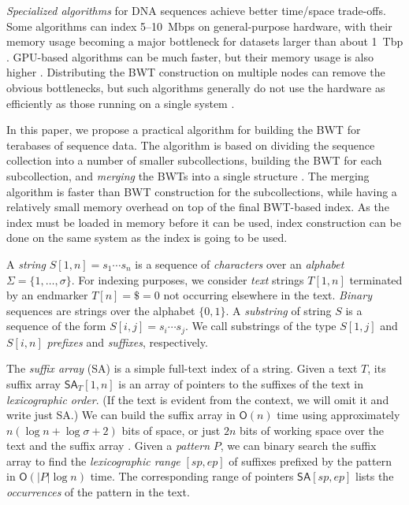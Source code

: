 \documentclass[smallabstract,smallcaptions]{dccpaper}
\newcommand{\set}[1]{\ensuremath{\{ #1 \}}}
\newcommand{\abs}[1]{\ensuremath{\lvert #1 \rvert}}
\newcommand{\Oh}{\ensuremath{\mathsf{O}}}
\newcommand{\SA}{\textsf{SA}}
\newcommand{\BWT}{\textsf{BWT}}
\newcommand{\mSA}{\ensuremath{\mathsf{SA}}}
\begin{document}
\emph{Specialized algorithms} for DNA sequences achieve better time/space trade-offs. Some algorithms can index 5\nobreakdash--10~Mbps on general-purpose hardware, with their memory usage becoming a major bottleneck for datasets larger than about 1~Tbp \cite{Bauer2013,Li2014a}. GPU-based algorithms can be much faster, but their memory usage is also higher \cite{Liu2014,Pantaleoni2014}. Distributing the \BWT{} construction on multiple nodes can remove the obvious bottlenecks, but such algorithms generally do not use the hardware as efficiently as those running on  a single system \cite{Wang2015}.

In this paper, we propose a practical algorithm for building the \BWT{} for terabases of sequence data. The algorithm is based on dividing the sequence collection into a number of smaller subcollections, building the \BWT{} for each subcollection, and \emph{merging} the \BWT{}s into a single structure \cite{Siren2009}. The merging algorithm is faster than \BWT{} construction for the subcollections, while having a relatively small memory overhead on top of the final \BWT-based index. As the index must be loaded in memory before it can be used, index construction can be done on the same system as the index is going to be used.



A \emph{string} $S[1,n] = s_{1} \dotsm s_{n}$ is a sequence of \emph{characters} over an \emph{alphabet} $\Sigma = \set{1, \dotsc, \sigma}$. For indexing purposes, we consider \emph{text} strings $T[1,n]$ terminated by an endmarker $T[n] = \$ = 0$ not occurring elsewhere in the text. \emph{Binary} sequences are strings over the alphabet $\set{0, 1}$. A \emph{substring} of string $S$ is a sequence of the form $S[i,j] = s_{i} \dotsm s_{j}$. We call substrings of the type $S[1,j]$ and $S[i,n]$ \emph{prefixes} and \emph{suffixes}, respectively.

The \emph{suffix array} (\SA) \cite{Manber1993} is a simple full-text index of a string. Given a text $T$, its suffix array $\mSA_{T}[1,n]$ is an array of pointers to the suffixes of the text in \emph{lexicographic order}. (If the text is evident from the context, we will omit it and write just \SA.) We can build the suffix array in $\Oh(n)$ time using approximately $n(\log n + \log \sigma + 2)$ bits of space, or just $2n$ bits of working space over the text and the suffix array \cite{Nong2011}. Given a \emph{pattern} $P$, we can binary search the suffix array to find the \emph{lexicographic range} $[sp,ep]$ of suffixes prefixed by the pattern in $\Oh(\abs{P} \log n)$ time. The corresponding range of pointers $\mSA[sp,ep]$ lists the \emph{occurrences} of the pattern in the text.
\end{document}
